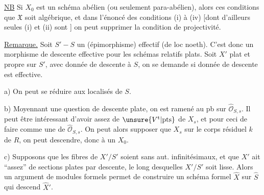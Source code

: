 \uline{NB} Si $X_0$ est un schéma abélien  (ou seulement para-abélien), alors ces conditions   que $\mathfrak X$ soit algébrique, et dans l'énoncé des conditions (i) à (iv) [dont d'ailleurs seules (i) et (ii) sont ] on peut supprimer la condition de projectivité.

\uline{Remarque.} Soit $S'\mathbin{-}S$ un
(épimorphisme) effectif (de loc noeth). C'est donc un morphisme de descente effective pour les schémas relatifs plats. Soit $X'$ plat et propre sur $S'$, avec donnée de descente à $S$, on  se demande si donnée de descente est effective.

a) On peut se réduire aux localisés  de $S$.

b) Moyennant une question de descente   plate, on est ramené au pb sur $\widehat{\mathcal O}_{S,s}$. Il peut être intéressant d'avoir  assez de $\unsure{V^{\mathrm t}|\mathrm{pts}}$ de $X_s$, et pour ceci de faire comme une     de $\widehat{\mathcal O}_{S,s}$. On peut alors supposer que $X_s$ sur le corps résiduel $k$ de $R$, on peut descendre, donc  à un $X_0$.

c) Supposons  que les fibres de $X'/S'$ soient sans aut. infinitésimaux, et que $X'$  ait  ``assez'' de sections   plates par descente, le long desquelles $X'/S'$ soit lisse. Alors un argument de modules formels permet de construire un schéma formel $\widehat X$ sur $\widehat S$ qui descend $\widehat X'$.

